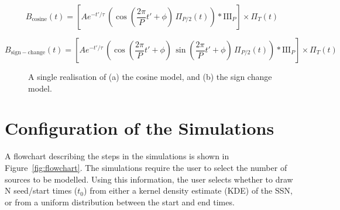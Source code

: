 \begin{equation}
B_{\mathrm{cosine}}(t) = \left[ A e^{-t'/\tau} \, \left( \cos{\left(\frac{2\pi}{P}t' + \phi\right)} \, \Pi_{P/2}(t) \right) * \mathrm{III}_{P} \right] \times \Pi_{T}(t)
\label{eq:cosine_model}
\end{equation}


\begin{equation}
B_{\mathrm{sign-change}}(t) = \left[ A e^{-t'/\tau} \, \left( \cos{\left(\frac{2\pi}{P}t' + \phi\right)} \, \sin{\left(\frac{2\pi}{P}t' + \phi\right)} \, \Pi_{P/2}(t) \right) * \mathrm{III}_{P} \right] \times \Pi_{T}(t)
\label{eq:sgn_cng_model}
\end{equation}


\begin{figure}[ht!]
	\centering
	\qquad
	\caption{A single realisation of (a) the cosine model, and (b) the sign change model.}  
	\label{fig:artificial_TS}
\end{figure}


\section{Configuration of the Simulations}

A flowchart describing the steps in the simulations is shown in Figure~\ref{fig:flowchart}. The simulations require the user to select the number of sources to be modelled. Using this information, the user selects whether to draw N seed/start times ($t_0$) from either a kernel density estimate (KDE) of the SSN, or from a uniform distribution between the start and end times.

